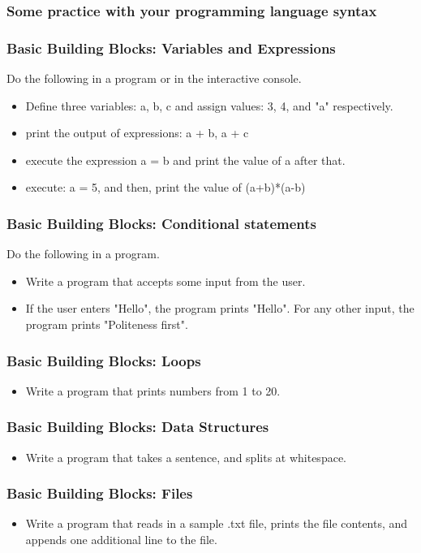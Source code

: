 \documentclass{beamer}
\begin{document}
\begin{frame}
\frametitle{Some practice with your programming language syntax}
\end{frame}

\begin{frame}
\frametitle{Basic Building Blocks: Variables and Expressions}
Do the following in a program or in the interactive console.
\begin{itemize}
\item Define three variables: a, b, c and assign values: 3, 4, and "a" respectively.
\item print the output of expressions: a + b, a + c
\item execute the expression a = b and print the value of a after that.
\item execute: a = 5, and then, print the value of (a+b)*(a-b)
\end{itemize}
\end{frame}


\begin{frame}
\frametitle{Basic Building Blocks: Conditional statements}
Do the following in a program.
\begin{itemize}
\item Write a program that accepts some input from the user.
\item If the user enters "Hello", the program prints "Hello". For any other input, the program prints "Politeness first". 
\end{itemize}
\end{frame}

\begin{frame}
\frametitle{Basic Building Blocks: Loops}
\begin{itemize}
\item Write a program that prints numbers from 1 to 20. 
\end{itemize}
\end{frame}

\begin{frame}
\frametitle{Basic Building Blocks: Data Structures}
\begin{itemize}
\item Write a program that takes a sentence, and splits at whitespace.
\end{itemize}
\end{frame}


\begin{frame}
\frametitle{Basic Building Blocks: Files}
\begin{itemize}
\item Write a program that reads in a sample .txt file, prints the file contents, and appends one additional line to the file. 
\end{itemize}
\end{frame}
\end{document}
